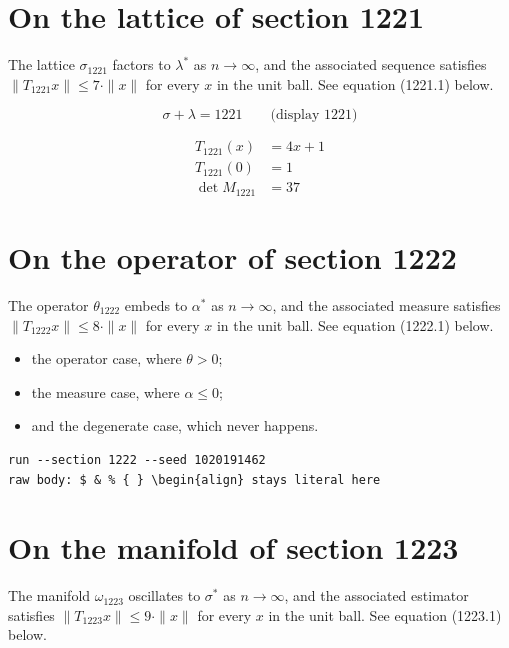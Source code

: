 \documentclass{article}
\begin{document}
\section{On the lattice of section 1221}
The lattice $\sigma_{1221}$ factors to $\lambda^{*}$ as $n \to \infty$,
and the associated sequence satisfies $\|T_{1221} x\| \leq 7 \cdot \|x\|$
for every $x$ in the unit ball. See equation (1221.1) below.

$$
\sigma + \lambda = 1221 \qquad \text{(display 1221)}
$$

\begin{align}
T_{1221}(x) &= 4 x + 1 \\
T_{1221}(0) &= 1 \\
\det M_{1221} &= 37
\end{align}

\section{On the operator of section 1222}
The operator $\theta_{1222}$ embeds to $\alpha^{*}$ as $n \to \infty$,
and the associated measure satisfies $\|T_{1222} x\| \leq 8 \cdot \|x\|$
for every $x$ in the unit ball. See equation (1222.1) below.

\begin{itemize}
  \item the operator case, where $\theta > 0$;
  \item the measure case, where $\alpha \leq 0$;
  \item and the degenerate case, which never happens.
\end{itemize}

\begin{verbatim}
run --section 1222 --seed 1020191462
raw body: $ & % { } \begin{align} stays literal here
\end{verbatim}

\section{On the manifold of section 1223}
The manifold $\omega_{1223}$ oscillates to $\sigma^{*}$ as $n \to \infty$,
and the associated estimator satisfies $\|T_{1223} x\| \leq 9 \cdot \|x\|$
for every $x$ in the unit ball. See equation (1223.1) below.
\end{document}
